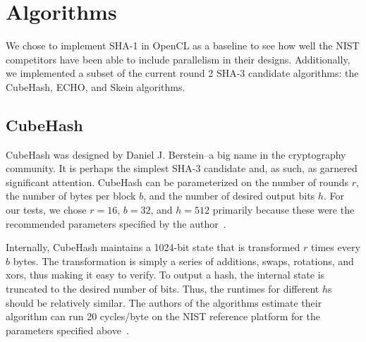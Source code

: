 \section*{Algorithms}
We chose to implement SHA-1 in OpenCL as a baseline to see how well the NIST competitors have been able to include parallelism in their designs.
Additionally, we implemented a subset of the current round 2 SHA-3 candidate algorithms: the CubeHash, ECHO, and Skein algorithms.

\subsection*{CubeHash}

CubeHash was designed by Daniel J. Berstein--a big name in the cryptography community.
It is perhaps the simplest SHA-3 candidate and, as such, as garnered significant attention.
CubeHash can be parameterized on the number of rounds $r$, the number of bytes per block $b$, and the number of desired output bits $h$.
For our tests, we chose $r=16$, $b=32$, and $h=512$ primarily because these were the recommended parameters specified by the author~\cite{CubeHash-spec}.

Internally, CubeHash maintains a 1024-bit state that is transformed $r$ times every $b$ bytes.
The transformation is simply a series of additions, swaps, rotations, and xors, thus making it easy to verify.
To output a hash, the internal state is truncated to the desired number of bits.
Thus, the runtimes for different $h$s should be relatively similar.
The authors of the algorithms estimate their algorithm can run 20 cycles/byte on the NIST reference platform for the parameters specified above~\cite{Bernstein}.

